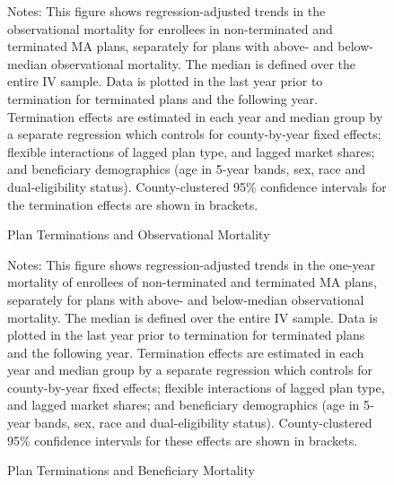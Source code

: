\documentclass[12pt,english,hidelinks]{article}
\begin{document}
\begin{figure}[t]
  \begin{center}
  \caption{\label{fig:first_stage}Plan Terminations and Observational Mortality}
  \vspace{-0.4cm}
  
  \end{center}
  \vspace{-0.3cm}
  {\footnotesize{}Notes: This figure shows regression-adjusted trends in the observational mortality for enrollees in non-terminated and terminated MA plans, separately for plans with above- and below-median observational mortality. The median is defined over the entire IV sample. Data is plotted in the last year prior to termination for terminated plans and the following year. Termination effects are estimated in each year and median group by a separate regression which controls for county-by-year fixed effects; flexible interactions of lagged plan type, and lagged market shares; and beneficiary demographics (age in 5-year bands, sex, race and dual-eligibility status). County-clustered 95\% confidence intervals for the termination effects are shown in brackets.}
  {\footnotesize\par}
\end{figure}

\begin{figure}[t]
  \begin{center}
  \caption{\label{fig:diff_in_diff}Plan Terminations and Beneficiary Mortality}
  \vspace{-0.4cm}
  
  \end{center}
  \vspace{-0.3cm}
  {\footnotesize{}Notes: This figure shows regression-adjusted trends in the one-year mortality of enrollees of non-terminated and terminated MA plans, separately for plans with above- and below-median observational mortality. The median is defined over the entire IV sample. Data is plotted in the last year prior to termination for terminated plans and the following year. Termination effects are estimated in each year and median group by a separate regression which controls for county-by-year fixed effects; flexible interactions of lagged plan type, and lagged market shares; and beneficiary demographics (age in 5-year bands, sex, race and dual-eligibility status). County-clustered 95\% confidence intervals for these effects are shown in brackets.}
  {\footnotesize\par}
\end{figure}
\clearpage
\end{document}
